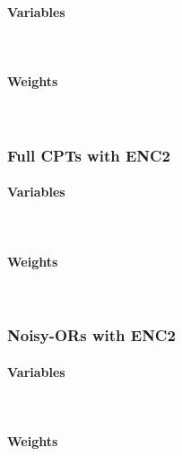 \documentclass{article}
\begin{document}
\paragraph{Variables}\mbox{}\\

\newpage
\paragraph{Weights}\mbox{}\\


\newpage

\subsubsection*{Full CPTs with ENC2}
\paragraph{Variables}\mbox{}\\

\newpage
\paragraph{Weights}\mbox{}\\


\newpage

\subsubsection*{Noisy-ORs with ENC2}
\paragraph{Variables}\mbox{}\\

\newpage
\paragraph{Weights}\mbox{}\\

\end{document}
